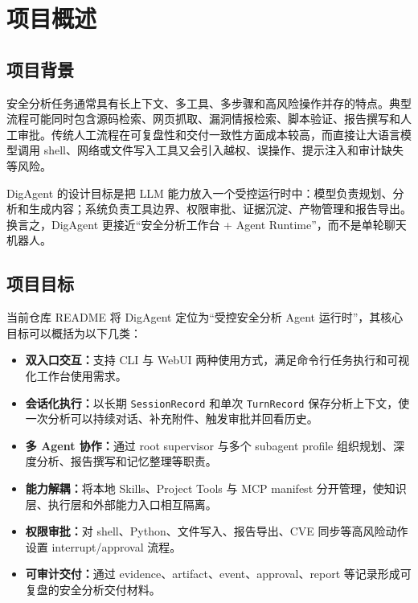 \documentclass[UTF8,zihao=-4,a4paper,fontset=none]{ctexart}
\newcommand{\code}[1]{\texttt{\footnotesize #1}}
\begin{document}
\tableofcontents
\newpage
{}

\section{项目概述}

\subsection{项目背景}

安全分析任务通常具有长上下文、多工具、多步骤和高风险操作并存的特点。典型流程可能同时包含源码检索、网页抓取、漏洞情报检索、脚本验证、报告撰写和人工审批。传统人工流程在可复盘性和交付一致性方面成本较高，而直接让大语言模型调用 shell、网络或文件写入工具又会引入越权、误操作、提示注入和审计缺失等风险。

DigAgent 的设计目标是把 LLM 能力放入一个受控运行时中：模型负责规划、分析和生成内容；系统负责工具边界、权限审批、证据沉淀、产物管理和报告导出。换言之，DigAgent 更接近“安全分析工作台 + Agent Runtime”，而不是单轮聊天机器人。

\subsection{项目目标}

当前仓库 README 将 DigAgent 定位为“受控安全分析 Agent 运行时”，其核心目标可以概括为以下几类：

\begin{itemize}
  \item \textbf{双入口交互：}支持 CLI 与 WebUI 两种使用方式，满足命令行任务执行和可视化工作台使用需求。
  \item \textbf{会话化执行：}以长期 \code{SessionRecord} 和单次 \code{TurnRecord} 保存分析上下文，使一次分析可以持续对话、补充附件、触发审批并回看历史。
  \item \textbf{多 Agent 协作：}通过 root supervisor 与多个 subagent profile 组织规划、深度分析、报告撰写和记忆整理等职责。
  \item \textbf{能力解耦：}将本地 Skills、Project Tools 与 MCP manifest 分开管理，使知识层、执行层和外部能力入口相互隔离。
  \item \textbf{权限审批：}对 shell、Python、文件写入、报告导出、CVE 同步等高风险动作设置 interrupt/approval 流程。
  \item \textbf{可审计交付：}通过 evidence、artifact、event、approval、report 等记录形成可复盘的安全分析交付材料。
\end{itemize}
\end{document}

